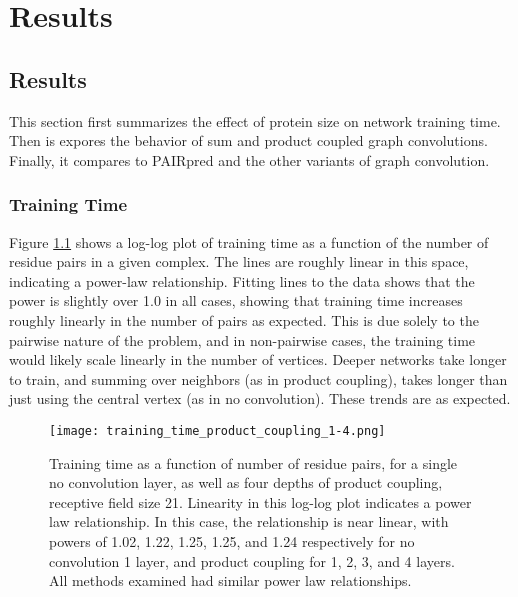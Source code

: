 \chapter{Results}
\label{chap:results}





\section{Results}

This section first summarizes the effect of protein size on network training time.
Then is expores the behavior of sum and product coupled graph convolutions.
Finally, it compares to PAIRpred and the other variants of graph convolution.


\subsection{Training Time}

Figure \ref{fig:train_times} shows a log-log plot of training time as a function of the number of residue pairs in a given complex.
The lines are roughly linear in this space, indicating a power-law relationship.
Fitting lines to the data shows that the power is slightly over 1.0 in all cases, showing that training time increases roughly linearly in the number of pairs as expected.
This is due solely to the pairwise nature of the problem, and in non-pairwise cases, the training time would likely scale linearly in the number of vertices.
Deeper networks take longer to train, and summing over neighbors (as in product coupling), takes longer than just using the central vertex (as in no convolution).
These trends are as expected. 


\begin{figure}
	\texttt{[image: training\_time\_product\_coupling\_1-4.png]}
	\caption{Training time as a function of number of residue pairs, for a single no convolution layer, as well as four depths of product coupling, receptive field size 21. Linearity in this log-log plot indicates a power law relationship. In this case, the relationship is near linear, with powers of 1.02, 1.22, 1.25, 1.25, and 1.24 respectively for no convolution 1 layer, and product coupling for 1, 2, 3, and 4 layers. All methods examined had similar power law relationships. 
		\label{fig:train_times}}
\end{figure}




